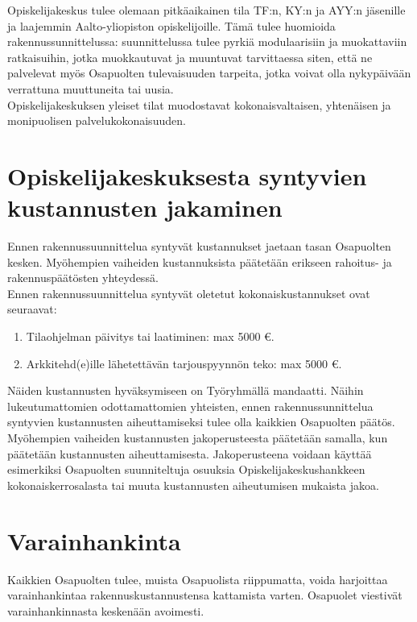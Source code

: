 \documentclass[a4paper, 12pt, finnish]{report}
\begin{document}
Opiskelijakeskus tulee olemaan pitkäaikainen tila TF:n, KY:n ja AYY:n jäsenille ja laajemmin Aalto-yliopiston opiskelijoille.
Tämä tulee huomioida rakennussunnittelussa: suunnittelussa tulee pyrkiä modulaarisiin ja muokattaviin ratkaisuihin, jotka muokkautuvat ja muuntuvat tarvittaessa siten, että ne palvelevat myös Osapuolten tulevaisuuden tarpeita, jotka voivat olla nykypäivään verrattuna muuttuneita tai uusia.\\

Opiskelijakeskuksen yleiset tilat muodostavat kokonaisvaltaisen, yhtenäisen ja monipuolisen palvelukokonaisuuden.


\section*{Opiskelijakeskuksesta syntyvien kustannusten jakaminen}
Ennen rakennussuunnittelua syntyvät kustannukset jaetaan tasan Osapuolten kesken. Myöhempien vaiheiden kustannuksista päätetään erikseen rahoitus- ja rakennuspäätösten yhteydessä.\\

Ennen rakennussuunnittelua syntyvät oletetut kokonaiskustannukset ovat seuraavat:

\begin{enumerate}
    \item Tilaohjelman päivitys tai laatiminen: max 5000 \euro{}.
    \item Arkkitehd(e)ille lähetettävän tarjouspyynnön teko: max 5000 \euro{}.
\end{enumerate}

Näiden kustannusten hyväksymiseen on Työryhmällä mandaatti.
Näihin lukeutumattomien odottamattomien yhteisten, ennen rakennussunnittelua syntyvien kustannusten aiheuttamiseksi tulee olla kaikkien Osapuolten päätös.\\

Myöhempien vaiheiden kustannusten jakoperusteesta päätetään samalla, kun päätetään kustannusten aiheuttamisesta.
Jakoperusteena voidaan käyttää esimerkiksi Osapuolten suunniteltuja osuuksia Opiskelijakeskushankkeen kokonaiskerrosalasta tai muuta kustannusten aiheutumisen mukaista jakoa.


\section*{Varainhankinta}
Kaikkien Osapuolten tulee, muista Osapuolista riippumatta, voida harjoittaa varainhankintaa rakennuskustannustensa kattamista varten.
Osapuolet viestivät varainhankinnasta keskenään avoimesti.
\end{document}
